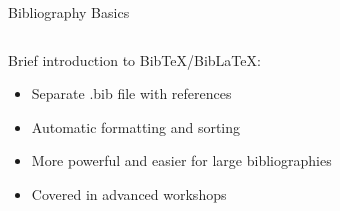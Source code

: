 \begin{frame}[fragile]{Bibliography Basics}
\begin{columns}
\begin{column}{0.5\textwidth}
               \begin{alertblock}{Brief introduction to BibTeX/BibLaTeX:}
                    \begin{itemize}
                         \item Separate .bib file with references
                         \item Automatic formatting and sorting
                         \item More powerful and easier for large bibliographies
                         \item Covered in advanced workshops
                    \end{itemize}
               \end{alertblock}
          \end{column}
     \end{columns}
\end{frame}

